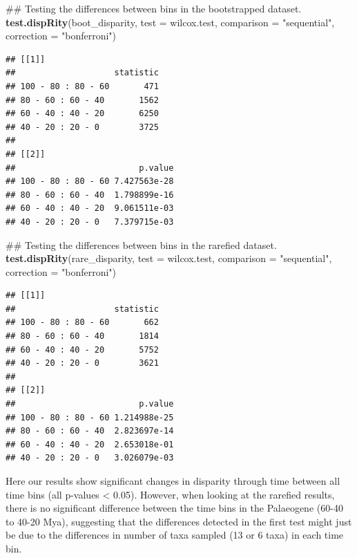 \documentclass[]{book}
\newenvironment{Shaded}{\begin{snugshade}}{\end{snugshade}}
\newcommand{\KeywordTok}[1]{\textcolor[rgb]{0.13,0.29,0.53}{\textbf{#1}}}
\newcommand{\DataTypeTok}[1]{\textcolor[rgb]{0.13,0.29,0.53}{#1}}
\newcommand{\StringTok}[1]{\textcolor[rgb]{0.31,0.60,0.02}{#1}}
\newcommand{\NormalTok}[1]{#1}
\theoremstyle{definition}
\theoremstyle{definition}
\theoremstyle{remark}
\begin{document}
\begin{Shaded}
\begin{Highlighting}[]
\NormalTok{## Testing the differences between bins in the bootstrapped dataset.}
\KeywordTok{test.dispRity}\NormalTok{(boot_disparity, }\DataTypeTok{test =}\NormalTok{ wilcox.test, }\DataTypeTok{comparison =} \StringTok{"sequential"}\NormalTok{,}
    \DataTypeTok{correction =} \StringTok{"bonferroni"}\NormalTok{)}
\end{Highlighting}
\end{Shaded}

\begin{verbatim}
## [[1]]
##                    statistic
## 100 - 80 : 80 - 60       471
## 80 - 60 : 60 - 40       1562
## 60 - 40 : 40 - 20       6250
## 40 - 20 : 20 - 0        3725
## 
## [[2]]
##                         p.value
## 100 - 80 : 80 - 60 7.427563e-28
## 80 - 60 : 60 - 40  1.798899e-16
## 60 - 40 : 40 - 20  9.061511e-03
## 40 - 20 : 20 - 0   7.379715e-03
\end{verbatim}

\begin{Shaded}
\begin{Highlighting}[]
\NormalTok{## Testing the differences between bins in the rarefied dataset.}
\KeywordTok{test.dispRity}\NormalTok{(rare_disparity, }\DataTypeTok{test =}\NormalTok{ wilcox.test, }\DataTypeTok{comparison =} \StringTok{"sequential"}\NormalTok{,}
    \DataTypeTok{correction =} \StringTok{"bonferroni"}\NormalTok{)}
\end{Highlighting}
\end{Shaded}

\begin{verbatim}
## [[1]]
##                    statistic
## 100 - 80 : 80 - 60       662
## 80 - 60 : 60 - 40       1814
## 60 - 40 : 40 - 20       5752
## 40 - 20 : 20 - 0        3621
## 
## [[2]]
##                         p.value
## 100 - 80 : 80 - 60 1.214988e-25
## 80 - 60 : 60 - 40  2.823697e-14
## 60 - 40 : 40 - 20  2.653018e-01
## 40 - 20 : 20 - 0   3.026079e-03
\end{verbatim}

Here our results show significant changes in disparity through time
between all time bins (all p-values \textless{} 0.05). However, when
looking at the rarefied results, there is no significant difference
between the time bins in the Palaeogene (60-40 to 40-20 Mya), suggesting
that the differences detected in the first test might just be due to the
differences in number of taxa sampled (13 or 6 taxa) in each time bin.
\end{document}
